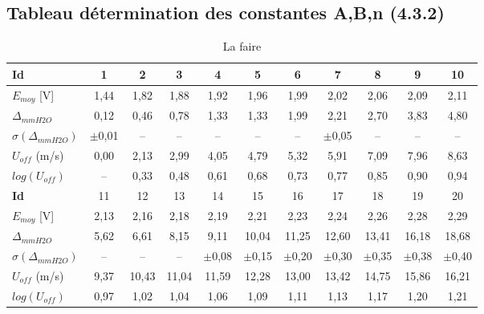\documentclass[12pt, a4paper]{report}
\begin{document}
	\subsection{Tableau détermination des constantes A,B,n (4.3.2)}
	\vspace{-2em}
	\begin{table}[h]
		\centering
		\small
		\begin{tabular}{l|cccccccccc}
			\toprule
			\textbf{Id} & 1 & 2 & 3 & 4 & 5 & 6 & 7 & 8 & 9 & 10 \\
			\midrule
			$E_{moy}$ [V] & 1,44 & 1,82 & 1,88 & 1,92 & 1,96 & 1,99 & 2,02 & 2,06 & 2,09 & 2,11 \\ \hline
			$\Delta_{mmH2O}$ & 0,12 & 0,46 & 0,78 & 1,33 & 1,33 & 1,99 & 2,21 & 2,70 & 3,83 & 4,80 \\ \hline
			\textbf{$\sigma (\Delta_{mmH2O}) $} & $\pm$0,01 & -- & -- & -- & -- & -- & $\pm$0,05 & -- & -- & -- \\ 
			\midrule
			$U_{off}$ (m/s) & 0,00 & 2,13 & 2,99 & 4,05 & 4,79 & 5,32 & 5,91 & 7,09 & 7,96 & 8,63 \\ \hline
			$log(U_{off})$ & -- & 0,33 & 0,48 & 0,61 & 0,68 & 0,73 & 0,77 & 0,85 & 0,90 & 0,94 \\
			\midrule
			\midrule
			\textbf{Id} & 11 & 12 & 13 & 14 & 15 & 16 & 17 & 18 & 19 & 20 \\
			\midrule
			$E_{moy}$ [V] & 2,13 & 2,16 & 2,18 & 2,19 & 2,21 & 2,23 & 2,24 & 2,26 & 2,28 & 2,29 \\ \hline
			$\Delta_{mmH2O}$ & 5,62 & 6,61 & 8,15 & 9,11 & 10,04 & 11,25 & 12,60 & 13,41 & 16,18 & 18,68 \\ \hline
			\textbf{$\sigma (\Delta_{mmH2O}) $} & -- & -- & -- & $\pm$0,08 & $\pm$0,15 & $\pm$0,20 & $\pm$0,30 & $\pm$0,35 & $\pm$0,38 & $\pm$0,40 \\
			\midrule
			$U_{off}$ (m/s) & 9,37 & 10,43 & 11,04 & 11,59 & 12,28 & 13,00 & 13,42 & 14,75 & 15,86 & 16,21 \\ \hline
			$log(U_{off})$ & 0,97 & 1,02 & 1,04 & 1,06 & 1,09 & 1,11 & 1,13 & 1,17 & 1,20 & 1,21 \\
			\bottomrule
		\end{tabular}
		\caption{La faire}
	\end{table}
	
	\newpage
\end{document}
